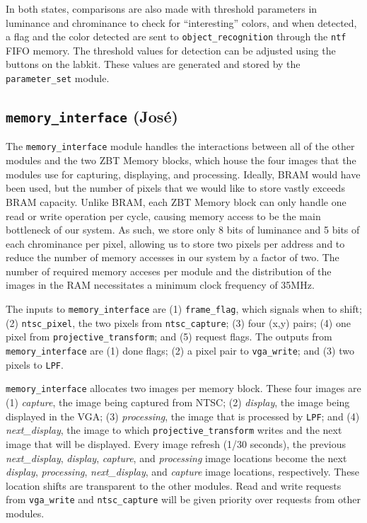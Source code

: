 \documentclass[10pt]{article}
\begin{document}
In both states, comparisons are also made with threshold parameters in luminance and chrominance to check for ``interesting'' colors, and when detected, a flag and the color detected are sent to {\tt object\_recognition} through the {\tt ntf} FIFO memory. The threshold values for detection can be adjusted using the buttons on the labkit. These values are generated and stored by the {\tt parameter\_set} module.

\subsection{{\tt memory\_interface} (Jos\'{e})}
The {\tt memory\_interface} module handles the interactions between all of the other modules and the two ZBT Memory blocks, which house the four images that the modules use for capturing, displaying, and processing. Ideally, BRAM would have been used, but the number of pixels that we would like to store vastly exceeds BRAM capacity. Unlike BRAM, each ZBT Memory block can only handle one read or write operation per cycle, causing memory access to be the main bottleneck of our system. As such, we store only 8 bits of luminance and 5 bits of each chrominance per pixel, allowing us to store two pixels per address and to reduce the number of memory accesses in our system by a factor of two. The number of required memory acceses per module and the distribution of the images in the RAM necessitates a minimum clock frequency of 35MHz.

The inputs to {\tt memory\_interface} are (1) {\tt frame\_flag}, which signals when to shift; (2) {\tt ntsc\_pixel}, the two pixels from {\tt ntsc\_capture}; (3) four (x,y) pairs; (4) one pixel from {\tt projective\_transform}; and (5) request flags. The outputs from {\tt memory\_interface} are (1) done flags; (2) a pixel pair to {\tt vga\_write}; and (3) two pixels to {\tt LPF}.

{\tt memory\_interface} allocates two images per memory block. These four images are (1) {\it capture}, the image being captured from NTSC; (2) {\it display}, the image being displayed in the VGA; (3) {\it processing}, the image that is processed by {\tt LPF}; and (4) {\it next\_display}, the image to which {\tt projective\_transform} writes and the next image that will be displayed. Every image refresh (1/30 seconds), the previous {\it next\_display}, {\it display}, {\it capture}, and {\it processing} image locations become the next {\it display}, {\it processing}, {\it next\_display}, and {\it capture} image locations, respectively. These location shifts are transparent to the other modules. Read and write requests from {\tt vga\_write} and {\tt ntsc\_capture} will be given priority over requests from other modules.
\end{document}
